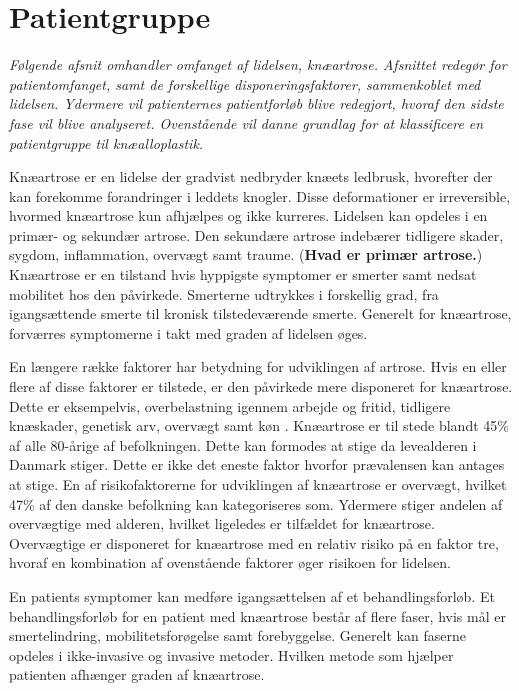 \section{Patientgruppe}
\textit{Følgende afsnit omhandler omfanget af lidelsen, knæartrose. Afsnittet redegør for patientomfanget, samt de forskellige disponeringsfaktorer, sammenkoblet med lidelsen. Ydermere vil patienternes patientforløb blive redegjort, hvoraf den sidste fase vil blive analyseret. Ovenstående vil danne grundlag for at klassificere en patientgruppe til knæalloplastik.}

Knæartrose er en lidelse der gradvist nedbryder knæets ledbrusk, hvorefter der kan forekomme forandringer i leddets knogler. Disse deformationer er irreversible, hvormed knæartrose kun afhjælpes og ikke kurreres. Lidelsen kan opdeles i en primær- og sekundær artrose. Den sekundære artrose indebærer tidligere skader, sygdom, inflammation, overvægt samt traume. (\textbf{Hvad er primær artrose.}) Knæartrose er en tilstand hvis hyppigste symptomer er smerter samt nedsat mobilitet hos den påvirkede. Smerterne udtrykkes i forskellig grad, fra igangsættende smerte til kronisk tilstedeværende smerte. Generelt for knæartrose, forværres symptomerne i takt med graden af lidelsen øges. \citep{Lind2016b}

En længere række faktorer har betydning for udviklingen af artrose. Hvis en eller flere af disse faktorer er tilstede, er den påvirkede mere disponeret for knæartrose. Dette er eksempelvis, overbelastning igennem arbejde og fritid, tidligere knæskader, genetisk arv, overvægt samt køn \citep{brostrom2012}. Knæartrose er til stede blandt 45\% af alle 80-årige af befolkningen. Dette kan formodes at stige da levealderen i Danmark stiger. Dette er ikke det eneste faktor hvorfor prævalensen kan antages at stige. En af risikofaktorerne for udviklingen af knæartrose er overvægt, hvilket 47\% af den danske befolkning kan kategoriseres som. Ydermere stiger andelen af overvægtige med alderen, hvilket ligeledes er tilfældet for knæartrose. Overvægtige er disponeret for knæartrose med en relativ risiko på en faktor tre, hvoraf en kombination af ovenstående faktorer øger risikoen for lidelsen. \citep{Vestergaard2014} \citep{Vestergaard2016} \citep{Lind2016} \citep{Lind2016b}

En patients symptomer kan medføre igangsættelsen af et behandlingsforløb. Et behandlingsforløb for en patient med knæartrose består af flere faser, hvis mål er smertelindring, mobilitetsforøgelse samt forebyggelse. Generelt kan faserne opdeles i ikke-invasive og invasive metoder. Hvilken metode som hjælper patienten afhænger graden af knæartrose. 


